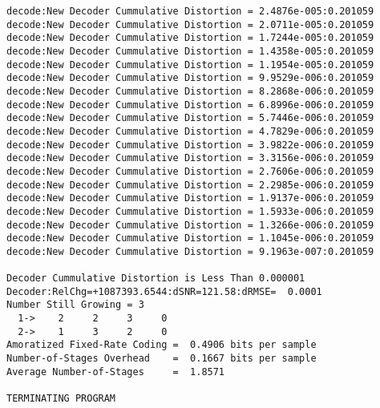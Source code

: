 \begin{verbatim}
decode:New Decoder Cummulative Distortion = 2.4876e-005:0.201059
decode:New Decoder Cummulative Distortion = 2.0711e-005:0.201059
decode:New Decoder Cummulative Distortion = 1.7244e-005:0.201059
decode:New Decoder Cummulative Distortion = 1.4358e-005:0.201059
decode:New Decoder Cummulative Distortion = 1.1954e-005:0.201059
decode:New Decoder Cummulative Distortion = 9.9529e-006:0.201059
decode:New Decoder Cummulative Distortion = 8.2868e-006:0.201059
decode:New Decoder Cummulative Distortion = 6.8996e-006:0.201059
decode:New Decoder Cummulative Distortion = 5.7446e-006:0.201059
decode:New Decoder Cummulative Distortion = 4.7829e-006:0.201059
decode:New Decoder Cummulative Distortion = 3.9822e-006:0.201059
decode:New Decoder Cummulative Distortion = 3.3156e-006:0.201059
decode:New Decoder Cummulative Distortion = 2.7606e-006:0.201059
decode:New Decoder Cummulative Distortion = 2.2985e-006:0.201059
decode:New Decoder Cummulative Distortion = 1.9137e-006:0.201059
decode:New Decoder Cummulative Distortion = 1.5933e-006:0.201059
decode:New Decoder Cummulative Distortion = 1.3266e-006:0.201059
decode:New Decoder Cummulative Distortion = 1.1045e-006:0.201059
decode:New Decoder Cummulative Distortion = 9.1963e-007:0.201059

Decoder Cummulative Distortion is Less Than 0.000001
Decoder:RelChg=+1087393.6544:dSNR=121.58:dRMSE=  0.0001
Number Still Growing = 3
  1->    2     2     3     0 
  2->    1     3     2     0 
Amoratized Fixed-Rate Coding =  0.4906 bits per sample
Number-of-Stages Overhead    =  0.1667 bits per sample
Average Number-of-Stages     =  1.8571

TERMINATING PROGRAM
\end{verbatim}
\normalsize


\clearpage
\newpage
\normalsize


